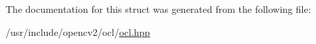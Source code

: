 The documentation for this struct was generated from the following file\-:\begin{DoxyCompactItemize}
\item 
/usr/include/opencv2/ocl/\hyperlink{ocl_2ocl_8hpp}{ocl.\-hpp}\end{DoxyCompactItemize}
